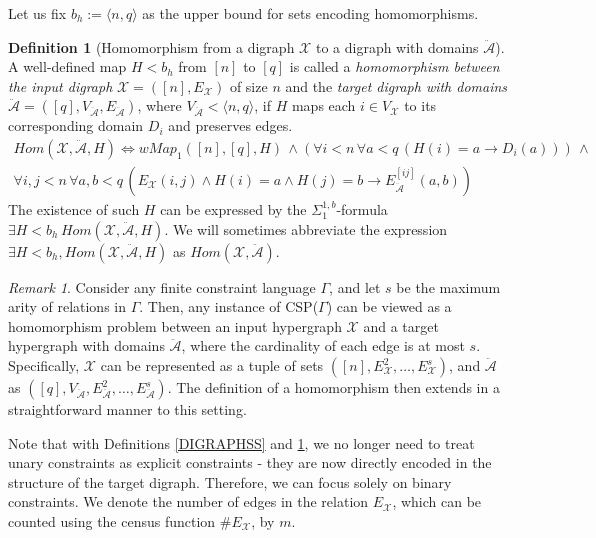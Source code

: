 \documentclass{article}
\theoremstyle{definition}
\newtheorem{df}{Definition}
\theoremstyle{theorem}
\theoremstyle{theorem}
\theoremstyle{remark}
\theoremstyle{remark}
\newtheorem{rem}{Remark}
\theoremstyle{example}
\theoremstyle{notation}
\theoremstyle{theorem}
\begin{document}
Let us fix $b_h := \langle n, q \rangle$ as the upper bound for sets encoding homomorphisms.

\begin{df}[Homomorphism from a digraph $\mathcal{X}$ to a digraph with domains $\ddot{\mathcal{A}}$]\label{krjfhpakrhfgdrg}
A well-defined map $H < b_h$ from $[n]$ to $[q]$ is called a \emph{homomorphism between the input digraph} $\mathcal{X} = ([n], E_{\mathcal{X}})$ of size $n$ and the \emph{target digraph with domains} $\ddot{\mathcal{A}} = ([q], V_{\ddot{\mathcal{A}}}, E_{\ddot{\mathcal{A}}})$, where $V_{\ddot{\mathcal{A}}} < \langle n, q \rangle$, if $H$ maps each $i \in V_{\mathcal{X}}$ to its corresponding domain $D_i$ and preserves edges.
\begin{equation}\label{HOMINSTAG}
\begin{gathered}
Hom(\mathcal{X}, \ddot{\mathcal{A}}, H) \iff  
wMap_1([n], [q], H)\,\wedge (\forall i < n\, \forall a < q\, (H(i) = a \rightarrow D_i(a)))\,\wedge \\
\forall i, j < n\, \forall a, b < q\, 
(E_{\mathcal{X}}(i, j) \wedge H(i) = a \wedge H(j) = b \rightarrow E^{[ij]}_{\ddot{\mathcal{A}}}(a, b))
\end{gathered}
\end{equation}
The existence of such $H$ can be expressed by the $\Sigma^{1,b}_{1}$-formula $\exists H < b_h\,Hom(\mathcal{X}, \ddot{\mathcal{A}}, H)$. We will sometimes abbreviate the expression $\exists H < b_h,Hom(\mathcal{X}, \ddot{\mathcal{A}}, H)$ as $Hom(\mathcal{X}, \ddot{\mathcal{A}})$.
\end{df}

\begin{rem}
    Consider any finite constraint language $\Gamma$, and let $s$ be the maximum arity of relations in $\Gamma$. Then, any instance of CSP($\Gamma$) can be viewed as a homomorphism problem between an input hypergraph $\mathcal{X}$ and a target hypergraph with domains $\ddot{\mathcal{A}}$, where the cardinality of each edge is at most $s$. Specifically, $\mathcal{X}$ can be represented as a tuple of sets $([n], E^2_{\mathcal{X}},\ldots,E^s_{\mathcal{X}})$, and $\ddot{\mathcal{A}}$ as $([q], V_{\ddot{\mathcal{A}}}, E^2_{\ddot{\mathcal{A}}},\ldots,E^s_{\ddot{\mathcal{A}}})$. The definition of a homomorphism then extends in a straightforward manner to this setting.
\end{rem}

Note that with Definitions \ref{DIGRAPHSS} and \ref{krjfhpakrhfgdrg}, we no longer need to treat unary constraints as explicit constraints - they are now directly encoded in the structure of the target digraph. Therefore, we can focus solely on binary constraints. We denote the number of edges in the relation $E_{\mathcal{X}}$, which can be counted using the census function $\#E_{\mathcal{X}}$, by $m$.
\end{document}
